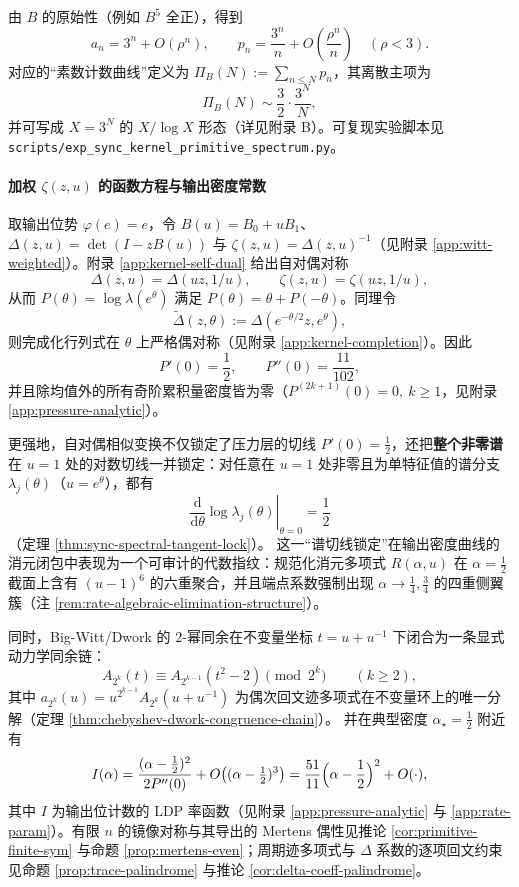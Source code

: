 由 $B$ 的原始性（例如 $B^5$ 全正），得到
\[
a_n=3^n+O(\rho^n),\qquad
p_n=\frac{3^n}{n}+O\!\left(\frac{\rho^n}{n}\right)\quad(\rho<3).
\]
对应的“素数计数曲线”定义为 $\Pi_B(N):=\sum_{n\le N}p_n$，其离散主项为
\[
\Pi_B(N)\sim \frac{3}{2}\cdot \frac{3^N}{N},
\]
并可写成 $X=3^N$ 的 $X/\log X$ 形态（详见附录 B）。可复现实验脚本见 \texttt{scripts/exp\_sync\_kernel\_primitive\_spectrum.py}。

\paragraph{加权 $\zeta(z,u)$ 的函数方程与输出密度常数}
取输出位势 $\varphi(e)=e$，令 $B(u)=B_0+uB_1$、$\Delta(z,u)=\det(I-zB(u))$ 与 $\zeta(z,u)=\Delta(z,u)^{-1}$（见附录 \ref{app:witt-weighted}）。附录 \ref{app:kernel-self-dual} 给出自对偶对称
\[
\Delta(z,u)=\Delta(uz,1/u),\qquad
\zeta(z,u)=\zeta(uz,1/u),
\]
从而 $P(\theta)=\log\lambda(e^\theta)$ 满足 $P(\theta)=\theta+P(-\theta)$。同理令
\[
\widetilde{\Delta}(z,\theta):=\Delta(e^{-\theta/2}z,e^\theta),
\]
则完成化行列式在 $\theta$ 上严格偶对称（见附录 \ref{app:kernel-completion}）。因此
\[
P'(0)=\frac12,\qquad P''(0)=\frac{11}{102},
\]
并且除均值外的所有奇阶累积量密度皆为零（$P^{(2k+1)}(0)=0,\ k\ge 1$，见附录 \ref{app:pressure-analytic}）。
\par
更强地，自对偶相似变换不仅锁定了压力层的切线 \(P'(0)=\tfrac12\)，还把\textbf{整个非零谱}在 \(u=1\) 处的对数切线一并锁定：对任意在 \(u=1\) 处非零且为单特征值的谱分支 \(\lambda_j(\theta)\)（\(u=e^\theta\)），都有
\[
\left.\frac{\mathrm{d}}{\mathrm{d}\theta}\log\lambda_j(\theta)\right|_{\theta=0}=\frac12
\]
（定理 \ref{thm:sync-spectral-tangent-lock}）。
这一“谱切线锁定”在输出密度曲线的消元闭包中表现为一个可审计的代数指纹：规范化消元多项式 \(R(\alpha,u)\) 在 \(\alpha=\tfrac12\) 截面上含有 \((u-1)^6\) 的六重聚合，并且端点系数强制出现 \(\alpha\to\tfrac14,\tfrac34\) 的四重侧翼簇（注 \ref{rem:rate-algebraic-elimination-structure}）。
\par
同时，Big-Witt/Dwork 的 \(2\)-幂同余在不变量坐标 \(t=u+u^{-1}\) 下闭合为一条显式动力学同余链：
\[
A_{2^k}(t)\equiv A_{2^{k-1}}(t^2-2)\pmod{2^k}\qquad(k\ge 2),
\]
其中 \(a_{2^k}(u)=u^{2^{k-1}}A_{2^k}(u+u^{-1})\) 为偶次回文迹多项式在不变量环上的唯一分解（定理 \ref{thm:chebyshev-dwork-congruence-chain}）。
并在典型密度 $\alpha_\star=\frac12$ 附近有
\[
I(\alpha)=\frac{(\alpha-\frac12)^2}{2P''(0)}+O\!\left((\alpha-\tfrac12)^3\right)
=\frac{51}{11}\Bigl(\alpha-\frac12\Bigr)^2+O(\cdot),
\]
其中 $I$ 为输出位计数的 LDP 率函数（见附录 \ref{app:pressure-analytic} 与 \ref{app:rate-param}）。有限 $n$ 的镜像对称与其导出的 Mertens 偶性见推论 \ref{cor:primitive-finite-sym} 与命题 \ref{prop:mertens-even}；周期迹多项式与 $\Delta$ 系数的逐项回文约束见命题 \ref{prop:trace-palindrome} 与推论 \ref{cor:delta-coeff-palindrome}。

